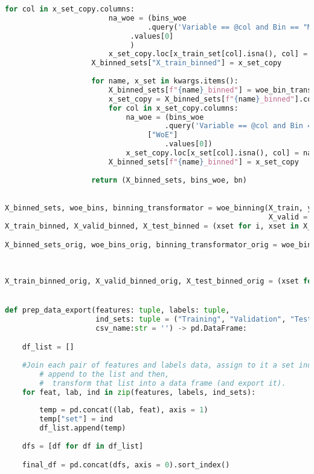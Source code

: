 \begin{lstlisting}[language=Python, basicstyle=\footnotesize\ttfamily]
					for col in x_set_copy.columns:
						na_woe = (bins_woe
						         .query('Variable == @col and Bin == "Missing"')["WoE"]
							 .values[0]
							 )
						x_set_copy.loc[x_train_set[col].isna(), col] = na_woe
					X_binned_sets["X_train_binned"] = x_set_copy
				
					for name, x_set in kwargs.items():
						X_binned_sets[f"{name}_binned"] = woe_bin_transform(bn, x_set)
						x_set_copy = X_binned_sets[f"{name}_binned"].copy()
						for col in x_set_copy.columns:
							na_woe = (bins_woe
							         .query('Variable == @col and Bin == "Missing"')
								 ["WoE"]
					           		 .values[0])
							x_set_copy.loc[x_set[col].isna(), col] = na_woe
						X_binned_sets[f"{name}_binned"] = x_set_copy
				
					return (X_binned_sets, bins_woe, bn)

				
X_binned_sets, woe_bins, binning_transformator = woe_binning(X_train, y_train, cat_vars,
                                                             X_valid = X_valid, X_test = X_test)
X_train_binned, X_valid_binned, X_test_binned = (xset for i, xset in X_binned_sets.items())

X_binned_sets_orig, woe_bins_orig, binning_transformator_orig = woe_binning(X_train_orig, y_train_orig,
                                                                            export = False, cat_vars,
                                                                            X_valid = X_valid_orig,
                                                                            X_test = X_test_orig)
X_train_binned_orig, X_valid_binned_orig, X_test_binned_orig = (xset for i, xset in X_binned_sets_orig.items())


def prep_data_export(features: tuple, labels: tuple,
                     ind_sets: tuple = ("Training", "Validation", "Test"),
                     csv_name:str = '') -> pd.DataFrame:

    df_list = []
    
    #Join each pair of features and labels data, assign to it a set indicator,
        # append to the list and then,
        #  transform that list into a data frame (and export it).
    for feat, lab, ind in zip(features, labels, ind_sets):
        
        temp = pd.concat((lab, feat), axis = 1)
        temp["set"] = ind
        df_list.append(temp)
    
    dfs = [df for df in df_list]

    final_df = pd.concat(dfs, axis = 0).sort_index()


\end{lstlisting}
